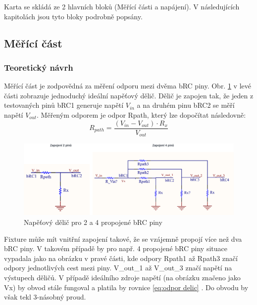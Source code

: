         Karta se skládá ze 2 hlavních bloků (Měřící části a napájení). V následujících kapitolách jsou tyto bloky
        podrobně popsány.
        \clearpage

        \subsection{Měřící část}
        \subsubsection{Teoretický návrh}
        Měřící část je zodpovědná za měření odporu mezi dvěma bRC piny.
        Obr. \ref{fig:Napěťový dělič pro 2 a 4 propojené bRC piny} v levé části zobrazuje
        jednoduchý ideální napěťový dělič.
        Dělič je zapojen tak, že jeden z testovaných pinů bRC1 generuje napětí $V_{in}$
        a na druhém pinu bRC2 se měří napětí $V_{out}$.
        Měřeným odporem je odpor Rpath, který lze dopočítat následovně:\\
        
        \begin{equation}\label{eq:odpor delic}
            R_{path} = \frac{(V_{in} - V_{out}) \cdot R_x}{V_{out}}
        \end{equation}
        
    \begin{figure}[ht!]
            \centering
            \includegraphics[width = 1\textwidth]{obrazky/2_and_4_pins_connection.png}
            \caption{Napěťový dělič pro 2 a 4 propojené bRC piny}
            \label{fig:Napěťový dělič pro 2 a 4 propojené bRC piny}
    \end{figure}

    Fixture může mít vnitřní zapojení takové, že se vzájemně propojí více než dva bRC piny. V takovém případě by pro např. 4 propojené bRC piny situace
    vypadala jako na obrázku v pravé části, kde odpory Rpath1 až Rpath3 značí odpory jednotlivých cest mezi piny. V\_out\_1 až V\_out\_3 značí napětí na
    výstupech děličů. V případě ideálního zdroje napětí (na obrázku značeno jako Vx) by obvod stále fungoval a platila by
    rovnice \ref{eq:odpor delic} . Do obvodu by však tekl 3-násobný proud.\\
    
